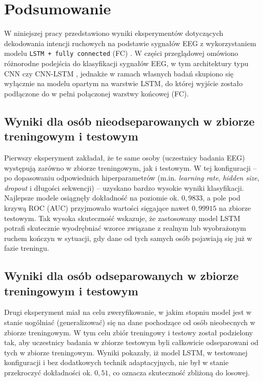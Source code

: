 \documentclass[eeg_v4.tex]{subfiles}
\begin{document}
    \section{Podsumowanie}
    \label{sec:podsumowanie}

    W niniejszej pracy przedstawiono wyniki eksperymentów dotyczących dekodowania intencji ruchowych na podstawie
    sygnałów
    EEG z wykorzystaniem modelu \texttt{LSTM + fully connected} (FC)
    . W części przeglądowej omówiono różnorodne podejścia do
    klasyfikacji sygnałów EEG, w tym architektury typu CNN czy CNN-LSTM \cite{boutarfaia2023,roots2020}, jednakże w ramach własnych badań
    skupiono się wyłącznie na modelu opartym na warstwie LSTM, do której wyjście zostało podłączone do w pełni
    połączonej
    warstwy końcowej (FC).

    \subsection*{Wyniki dla osób nieodseparowanych w zbiorze treningowym i testowym}
    Pierwszy eksperyment zakładał, że te same osoby (uczestnicy badania EEG) występują zarówno w zbiorze treningowym,
    jak i
    testowym. W tej konfiguracji – po dopasowaniu odpowiednich hiperparametrów (m.in. \textit{learning rate},
    \textit{hidden
    size}, \textit{dropout}
    i długości sekwencji) – uzyskano bardzo wysokie wyniki klasyfikacji. Najlepsze modele osiągnęły
    dokładność na poziomie ok. \(0{,}9833\), a pole pod krzywą ROC (AUC) przyjmowało wartości sięgające nawet
    \(0{,}99915\)
    na zbiorze testowym. Tak wysoka skuteczność wskazuje, że zastosowany model LSTM potrafi skutecznie wyodrębniać
    wzorce
    związane z realnym lub wyobrażonym ruchem kończyn w sytuacji, gdy dane od tych samych osób pojawiają się już w fazie
    treningu.

    \subsection*{Wyniki dla osób odseparowanych w zbiorze treningowym i testowym}
    Drugi eksperyment miał na celu zweryfikowanie, w jakim stopniu model jest w stanie uogólniać (generalizować) się na
    dane
    pochodzące od osób nieobecnych w zbiorze treningowym. W tym celu zbiór treningowy i testowy został podzielony tak,
    aby
    uczestnicy badania w zbiorze testowym byli całkowicie odseparowani od tych w zbiorze treningowym. Wyniki pokazały,
    iż
    model LSTM, w testowanej konfiguracji i bez dodatkowych technik adaptacyjnych, nie był w stanie przekroczyć
    dokładności
    ok. \(0{,}51\), co oznacza skuteczność zbliżoną do losowej.
\end{document}
